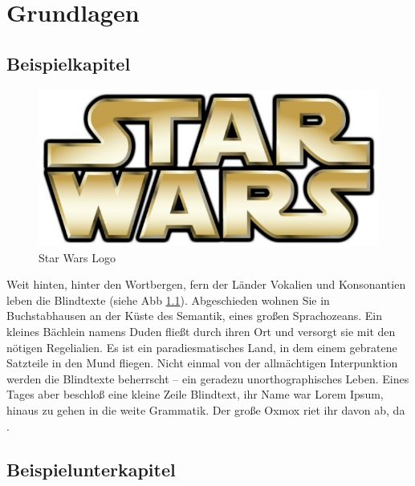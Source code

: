 \chapter{Grundlagen}
\label{sec:grundlagen}


\section{Beispielkapitel}
\label{sec:beispiel}
\begin{figure}[htb]
  \centering  
  \includegraphics[scale=0.5]{img/starwars.jpg}
  \caption{Star Wars Logo}
  \label{fig:starwars}
\end{figure}
Weit hinten, hinter den Wortbergen, fern der Länder Vokalien und Konsonantien leben die Blindtexte (siehe Abb \ref{fig:starwars}). Abgeschieden wohnen Sie in Buchstabhausen an der Küste des Semantik, eines großen Sprachozeans. Ein kleines Bächlein namens Duden fließt durch ihren Ort und versorgt sie mit den nötigen Regelialien. Es ist ein paradiesmatisches Land, in dem einem gebratene Satzteile in den Mund fliegen. Nicht einmal von der allmächtigen Interpunktion werden die Blindtexte beherrscht – ein geradezu unorthographisches Leben. Eines Tages aber beschloß eine kleine Zeile Blindtext, ihr Name war Lorem Ipsum, hinaus zu gehen in die weite Grammatik. Der große Oxmox riet ihr davon ab, da \cite{test}.

\section{Beispielunterkapitel}
\label{subsec:beispiel}
